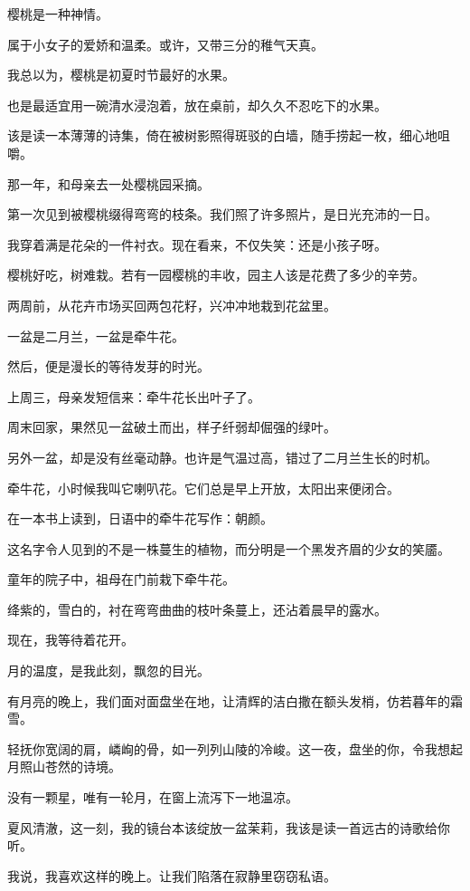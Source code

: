 		\vspace{1em}
		樱桃是一种神情。\par
		属于小女子的爱娇和温柔。或许，又带三分的稚气天真。\par
		我总以为，樱桃是初夏时节最好的水果。\par
		也是最适宜用一碗清水浸泡着，放在桌前，却久久不忍吃下的水果。\par
		该是读一本薄薄的诗集，倚在被树影照得斑驳的白墙，随手捞起一枚，细心地咀嚼。\par
		那一年，和母亲去一处樱桃园采摘。\par
		第一次见到被樱桃缀得弯弯的枝条。我们照了许多照片，是日光充沛的一日。\par
		我穿着满是花朵的一件衬衣。现在看来，不仅失笑：还是小孩子呀。\par
		樱桃好吃，树难栽。若有一园樱桃的丰收，园主人该是花费了多少的辛劳。

		\vspace{1em}
		两周前，从花卉市场买回两包花籽，兴冲冲地栽到花盆里。\par
		一盆是二月兰，一盆是牵牛花。\par
		然后，便是漫长的等待发芽的时光。\par
		上周三，母亲发短信来：牵牛花长出叶子了。\par
		周末回家，果然见一盆破土而出，样子纤弱却倔强的绿叶。\par
		另外一盆，却是没有丝毫动静。也许是气温过高，错过了二月兰生长的时机。\par
		牵牛花，小时候我叫它喇叭花。它们总是早上开放，太阳出来便闭合。\par
		在一本书上读到，日语中的牵牛花写作：朝颜。\par
		这名字令人见到的不是一株蔓生的植物，而分明是一个黑发齐眉的少女的笑靥。\par
		童年的院子中，祖母在门前栽下牵牛花。\par
		绛紫的，雪白的，衬在弯弯曲曲的枝叶条蔓上，还沾着晨早的露水。\par
		现在，我等待着花开。

	\endwriting



		月的温度，是我此刻，飘忽的目光。


		\vspace{1em}
		有月亮的晚上，我们面对面盘坐在地，让清辉的洁白撒在额头发梢，仿若暮年的霜雪。\par
		轻抚你宽阔的肩，嶙峋的骨，如一列列山陵的冷峻。这一夜，盘坐的你，令我想起月照山苍然的诗境。\par
		没有一颗星，唯有一轮月，在窗上流泻下一地温凉。\par
		夏风清澈，这一刻，我的镜台本该绽放一盆茉莉，我该是读一首远古的诗歌给你听。\par
		我说，我喜欢这样的晚上。让我们陷落在寂静里窃窃私语。

